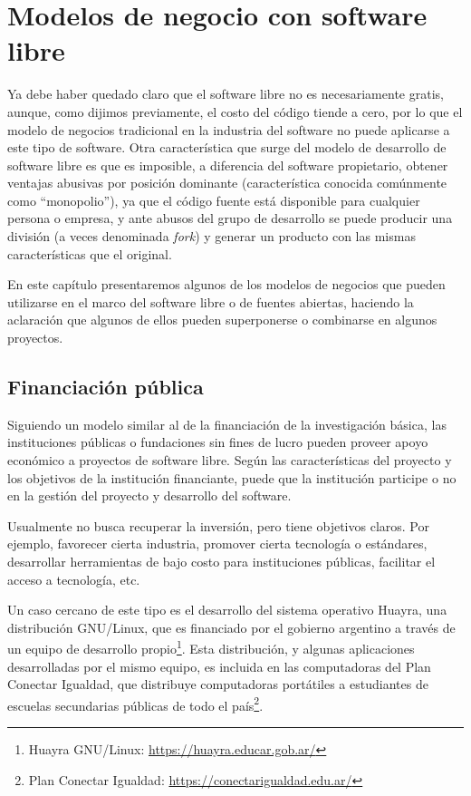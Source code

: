 \chapter{Modelos de negocio con software libre}

Ya debe haber quedado claro que el software libre no es necesariamente gratis, aunque, como dijimos previamente, el costo del código tiende a cero, por lo que el modelo de negocios tradicional en la industria del software no puede aplicarse a este tipo de software. Otra característica que surge del modelo de desarrollo de software libre es que es imposible, a diferencia del software propietario, obtener ventajas abusivas por posición dominante (característica conocida comúnmente como ``monopolio''), ya que el código fuente está disponible para cualquier persona o empresa, y ante abusos del grupo de desarrollo se puede producir una división (a veces denominada \emph{fork}) y generar un producto con las mismas características que el original. 

En este capítulo presentaremos algunos de los modelos de negocios que pueden utilizarse en el marco del software libre o de fuentes abiertas, haciendo la aclaración que algunos de ellos pueden superponerse o combinarse en algunos proyectos.

\section{Financiación pública}

Siguiendo un modelo similar al de la financiación de la investigación básica, las instituciones públicas o fundaciones sin fines de lucro pueden proveer apoyo económico a proyectos de software libre. Según las características del proyecto y los objetivos de la institución financiante, puede que la institución participe o no en la gestión del proyecto y desarrollo del software.

Usualmente no busca recuperar la inversión, pero tiene objetivos claros. Por ejemplo, favorecer cierta industria, promover cierta tecnología o estándares, desarrollar herramientas de bajo costo para instituciones públicas, facilitar el acceso a tecnología, etc.

Un caso cercano de este tipo es el desarrollo del sistema operativo Huayra, una distribución GNU/Linux, que es financiado por el gobierno argentino a través de un equipo de desarrollo propio\footnote{Huayra GNU/Linux: \url{https://huayra.educar.gob.ar/}}. Esta distribución, y algunas aplicaciones desarrolladas por el mismo equipo, es incluida en las computadoras del Plan Conectar Igualdad, que distribuye computadoras portátiles a estudiantes de escuelas secundarias públicas de todo el país\footnote{Plan Conectar Igualdad: \url{https://conectarigualdad.edu.ar/}}.

